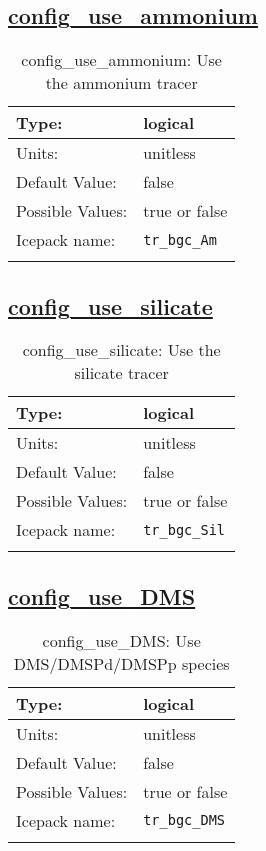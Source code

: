 \subsection[config\_use\_ammonium]{\hyperref[sec:nm_tab_biogeochemistry]{config\_use\_ammonium}}
\label{subsec:nm_sec_config_use_ammonium}
\begin{center}
\begin{longtable}{| p{2.0in} || p{4.0in} |}
    \hline
    Type: & logical \\
    \hline
    Units: & \si{unitless} \\
    \hline
    Default Value: & false \\
    \hline
    Possible Values: & true or false \\
    \hline
    \hline
    Icepack name: & \verb+tr_bgc_Am+ \\
    \caption{config\_use\_ammonium: Use the ammonium tracer}
\end{longtable}
\end{center}
\subsection[config\_use\_silicate]{\hyperref[sec:nm_tab_biogeochemistry]{config\_use\_silicate}}
\label{subsec:nm_sec_config_use_silicate}
\begin{center}
\begin{longtable}{| p{2.0in} || p{4.0in} |}
    \hline
    Type: & logical \\
    \hline
    Units: & \si{unitless} \\
    \hline
    Default Value: & false \\
    \hline
    Possible Values: & true or false \\
    \hline
    \hline
    Icepack name: & \verb+tr_bgc_Sil+ \\
    \caption{config\_use\_silicate: Use the silicate tracer}
\end{longtable}
\end{center}
\subsection[config\_use\_DMS]{\hyperref[sec:nm_tab_biogeochemistry]{config\_use\_DMS}}
\label{subsec:nm_sec_config_use_DMS}
\begin{center}
\begin{longtable}{| p{2.0in} || p{4.0in} |}
    \hline
    Type: & logical \\
    \hline
    Units: & \si{unitless} \\
    \hline
    Default Value: & false \\
    \hline
    Possible Values: & true or false \\
    \hline
    \hline
    Icepack name: & \verb+tr_bgc_DMS+ \\
    \caption{config\_use\_DMS: Use DMS/DMSPd/DMSPp species}
\end{longtable}
\end{center}
